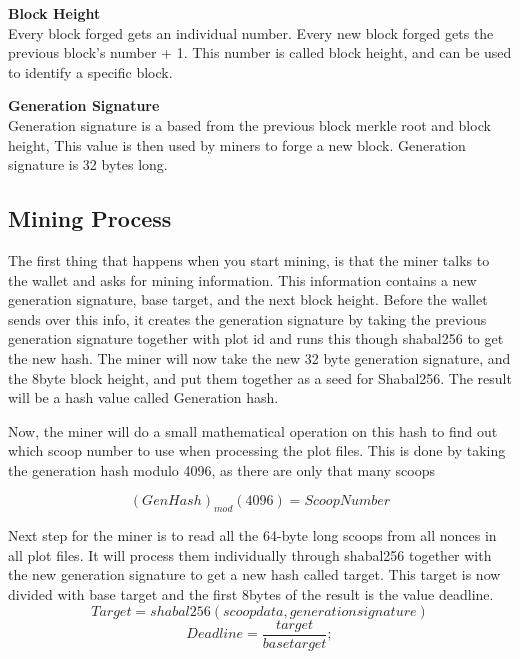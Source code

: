 \begin{flushleft}
    \textbf{Block Height}\\
    Every block forged gets an individual number. Every new block forged gets the previous block's number + 1. This number is called block height, and can be used to identify a specific block.
\end{flushleft}
\begin{flushleft}
    \textbf{Generation Signature}\\
    Generation signature is a based from the previous block merkle root and block height, This value is then used by miners to forge a new block. Generation signature is 32 bytes long.
\end{flushleft}
\subsection{Mining Process}
\begin{flushleft}
    The first thing that happens when you start mining, is that the miner talks to the wallet and asks for mining information. This information contains a new generation signature, base target, and the next block height. Before the wallet sends over this info, it creates the generation signature by taking the previous generation signature together with plot id and runs this though shabal256 to get the new hash. The miner will now take the new 32 byte generation signature, and the 8byte block height, and put them together as a seed for Shabal256. The result will be a hash value called Generation hash.
\end{flushleft}

\begin{flushleft}
    Now, the miner will do a small mathematical operation on this hash to find out which scoop number to use when processing the plot files. This is done by taking the generation hash modulo 4096, as there are only that many scoops
\end{flushleft}
\begin{equation}
    ({GenHash}) _{mod} ({4096}) = Scoop Number
\end{equation}
\begin{flushleft}
    Next step for the miner is to read all the 64-byte long scoops from all nonces in all plot files. It will process them individually through shabal256 together with the new generation signature to get a new hash called target. This target is now divided with base target and the first 8bytes of the result is the value deadline.
    \begin{equation}
        Target = shabal256 (scoop data, generation signature)
    \end{equation}
    \begin{equation}
        Deadline = \frac{target}{base target};
    \end{equation}
\end{flushleft}
